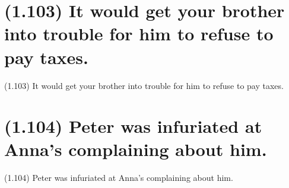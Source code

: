 \documentclass{article}
\begin{document}
\clearpage

%
%

\section*{(1.103) It would get your brother into trouble for him to refuse to pay taxes.}

\bigbreak
\begin{enumerate*}
\item[(1.103)] It would get your brother into trouble for him to refuse to pay taxes.
\end{enumerate*}
\bigbreak

\bigbreak
\begin{minipage}{\textwidth}
\end{minipage}
\bigbreak

\clearpage

%
%

\section*{(1.104) Peter was infuriated at Anna's complaining about him.}

\bigbreak
\begin{enumerate*}
\item[(1.104)] Peter was infuriated at Anna's complaining about him.
\end{enumerate*}
\bigbreak
\end{document}
